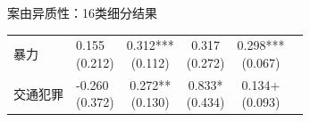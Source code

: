 \documentclass[aspectratio=169,10pt]{ctexbeamer}
\begin{document}
\begin{frame}[plain]{案由异质性：16类细分结果}
\begin{minipage}[t]{0.48\textwidth}
\begin{tabular}{llcccc}
      暴力 & \makecell{0.155\\(0.212)} & \makecell{0.312***\\(0.112)} & \makecell{0.317\\(0.272)} & \makecell{0.298***\\(0.067)} \\
      交通犯罪 & \makecell{-0.260\\(0.372)} & \makecell{0.272**\\(0.130)} & \makecell{0.833*\\(0.434)} & \makecell{0.134+\\(0.093)} \\
      \bottomrule
    \end{tabular}
  \end{minipage}

  \vspace{0.8em}


\end{frame}
\end{document}
